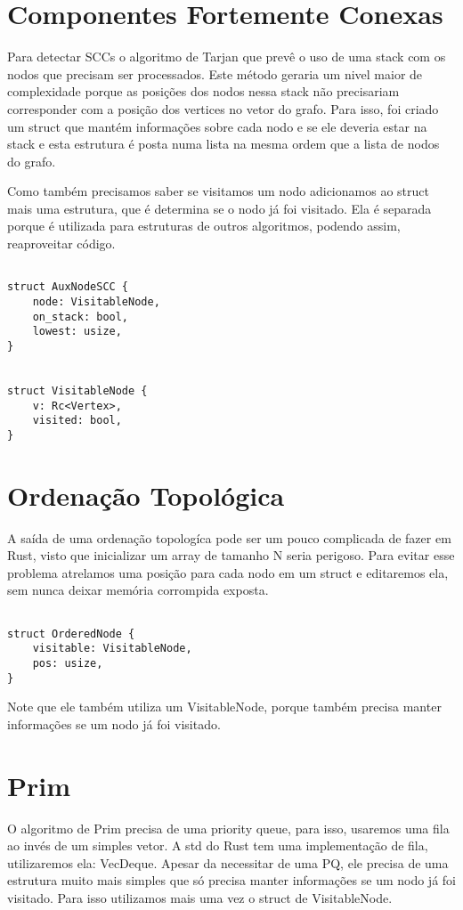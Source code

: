 \documentclass{article}
\begin{document}
\section{Componentes Fortemente Conexas}

Para detectar SCCs o algoritmo de Tarjan que prevê o uso de uma stack com os nodos que precisam ser processados. Este método geraria um nivel maior de complexidade porque as posições dos nodos nessa stack não
precisariam corresponder com a posição dos vertices no vetor do grafo. Para isso, foi criado um struct que mantém informações sobre cada nodo e se ele deveria estar na stack e esta estrutura é posta numa lista
na mesma ordem que a lista de nodos do grafo.

Como também precisamos saber se visitamos um nodo adicionamos ao struct mais uma estrutura, que é determina se o nodo já foi visitado. Ela é separada porque é utilizada para estruturas de outros algoritmos, podendo assim,
reaproveitar código.

\begin{verbatim}

struct AuxNodeSCC {
    node: VisitableNode,
    on_stack: bool,
    lowest: usize,
}


struct VisitableNode {
    v: Rc<Vertex>,
    visited: bool,
}

\end{verbatim}


\section{Ordenação Topológica}

A saída de uma ordenação topologíca pode ser um pouco complicada de fazer em Rust, visto que inicializar um array de tamanho N seria perigoso. Para evitar esse problema atrelamos uma posição para cada
nodo em um struct e editaremos ela, sem nunca deixar memória corrompida exposta.

\begin{verbatim}

struct OrderedNode {
    visitable: VisitableNode,
    pos: usize,
}

\end{verbatim}

Note que ele também utiliza um VisitableNode, porque também precisa manter informações se um nodo já foi visitado.

\section{Prim}
O algoritmo de Prim precisa de uma priority queue, para isso, usaremos uma fila ao invés de um simples vetor. A std do Rust tem uma implementação de fila, utilizaremos ela: VecDeque.
Apesar da necessitar de uma PQ, ele precisa de uma estrutura muito mais simples que só precisa manter informações se um nodo já foi visitado. Para isso utilizamos mais uma vez o struct de VisitableNode.
\end{document}
